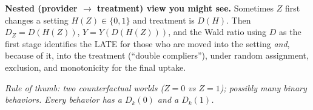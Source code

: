 \documentclass[10pt]{article}
\begin{document}
\textbf{Nested (provider $\to$ treatment) view you might see.}
Sometimes $Z$ first changes a setting $H(Z)\in\{0,1\}$ and treatment is $D(H)$.
Then $D_Z=D(H(Z))$, $Y=Y(D(H(Z)))$, and the Wald ratio using $D$ as the first stage identifies the LATE for those who are moved into the setting \emph{and}, because of it, into the treatment (``double compliers''), under random assignment, exclusion, and monotonicity for the final uptake.

\vfill\hfill\emph{Rule of thumb: two counterfactual worlds ($Z{=}0$ vs $Z{=}1$); possibly many binary behaviors. Every behavior has a $D_k(0)$ and a $D_k(1)$.}
\end{document}
